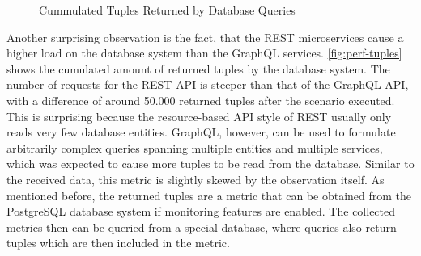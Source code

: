 \begin{figure}[b!]
    \centering
    \caption{Cummulated Tuples Returned by Database Queries}\label{fig:perf-tuples}    
\end{figure}

Another surprising observation is the fact, that the \ac{REST} microservices cause a higher load on the database system than the GraphQL services.
\autoref{fig:perf-tuples} shows the cumulated amount of returned tuples by the database system.
The number of requests for the \ac{REST} \ac{API} is steeper than that of the GraphQL \ac{API}, with a difference of around 50.000 returned tuples after the scenario executed.
This is surprising because the resource-based \ac{API} style of \ac{REST} usually only reads very few database entities.
GraphQL, however, can be used to formulate arbitrarily complex queries spanning multiple entities and multiple services, which was expected to cause more tuples to be read from the database.
Similar to the received data, this metric is slightly skewed by the observation itself.
As mentioned before, the returned tuples are a metric that can be obtained from the PostgreSQL database system if monitoring features are enabled.
The collected metrics then can be queried from a special database, where queries also return tuples which are then included in the metric.

